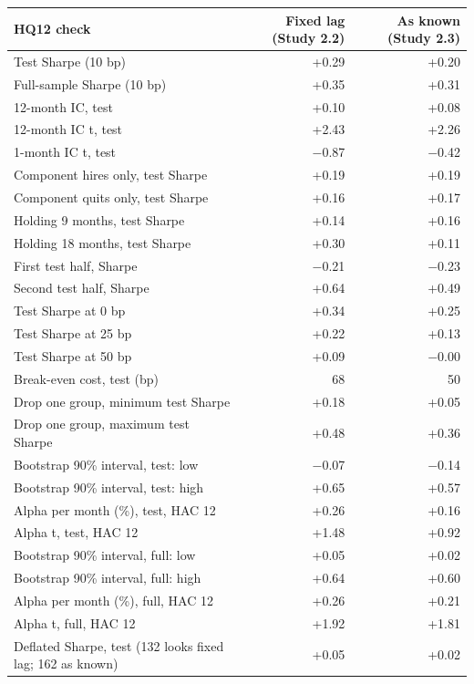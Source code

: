\begin{tabular}{lrr}
\toprule
HQ12 check & Fixed lag (Study 2.2) & As known (Study 2.3) \\
\midrule
Test Sharpe (10 bp) & +0.29 & +0.20 \\
Full-sample Sharpe (10 bp) & +0.35 & +0.31 \\
12-month IC, test & +0.10 & +0.08 \\
12-month IC t, test & +2.43 & +2.26 \\
1-month IC t, test & $-$0.87 & $-$0.42 \\
Component hires only, test Sharpe & +0.19 & +0.19 \\
Component quits only, test Sharpe & +0.16 & +0.17 \\
Holding 9 months, test Sharpe & +0.14 & +0.16 \\
Holding 18 months, test Sharpe & +0.30 & +0.11 \\
First test half, Sharpe & $-$0.21 & $-$0.23 \\
Second test half, Sharpe & +0.64 & +0.49 \\
Test Sharpe at 0 bp & +0.34 & +0.25 \\
Test Sharpe at 25 bp & +0.22 & +0.13 \\
Test Sharpe at 50 bp & +0.09 & $-$0.00 \\
Break-even cost, test (bp) & 68 & 50 \\
Drop one group, minimum test Sharpe & +0.18 & +0.05 \\
Drop one group, maximum test Sharpe & +0.48 & +0.36 \\
Bootstrap 90\% interval, test: low & $-$0.07 & $-$0.14 \\
Bootstrap 90\% interval, test: high & +0.65 & +0.57 \\
Alpha per month (\%), test, HAC 12 & +0.26 & +0.16 \\
Alpha t, test, HAC 12 & +1.48 & +0.92 \\
Bootstrap 90\% interval, full: low & +0.05 & +0.02 \\
Bootstrap 90\% interval, full: high & +0.64 & +0.60 \\
Alpha per month (\%), full, HAC 12 & +0.26 & +0.21 \\
Alpha t, full, HAC 12 & +1.92 & +1.81 \\
Deflated Sharpe, test (132 looks fixed lag; 162 as known) & +0.05 & +0.02 \\
\bottomrule
\end{tabular}
